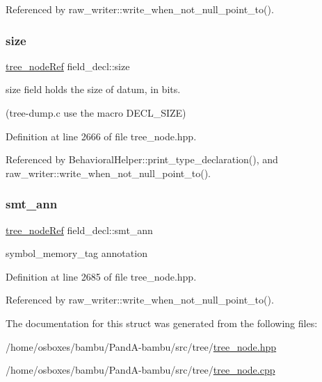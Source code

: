 Referenced by raw\+\_\+writer\+::write\+\_\+when\+\_\+not\+\_\+null\+\_\+point\+\_\+to().

\mbox{\label{structfield__decl_ab074346467af8cad446fb25cf82a73fe}} 
\subsubsection{\texorpdfstring{size}{size}}
{\footnotesize\ttfamily \hyperlink{tree__node_8hpp_a6ee377554d1c4871ad66a337eaa67fd5}{tree\+\_\+node\+Ref} field\+\_\+decl\+::size}



size field holds the size of datum, in bits. 

(tree-\/dump.\+c use the macro D\+E\+C\+L\+\_\+\+S\+I\+ZE) 

Definition at line 2666 of file tree\+\_\+node.\+hpp.



Referenced by Behavioral\+Helper\+::print\+\_\+type\+\_\+declaration(), and raw\+\_\+writer\+::write\+\_\+when\+\_\+not\+\_\+null\+\_\+point\+\_\+to().

\mbox{\label{structfield__decl_a66e3e30283c64fd9ac763d48c492a639}} 
\subsubsection{\texorpdfstring{smt\+\_\+ann}{smt\_ann}}
{\footnotesize\ttfamily \hyperlink{tree__node_8hpp_a6ee377554d1c4871ad66a337eaa67fd5}{tree\+\_\+node\+Ref} field\+\_\+decl\+::smt\+\_\+ann}



symbol\+\_\+memory\+\_\+tag annotation 



Definition at line 2685 of file tree\+\_\+node.\+hpp.



Referenced by raw\+\_\+writer\+::write\+\_\+when\+\_\+not\+\_\+null\+\_\+point\+\_\+to().



The documentation for this struct was generated from the following files\+:\begin{DoxyCompactItemize}
\item 
/home/osboxes/bambu/\+Pand\+A-\/bambu/src/tree/\hyperlink{tree__node_8hpp}{tree\+\_\+node.\+hpp}\item 
/home/osboxes/bambu/\+Pand\+A-\/bambu/src/tree/\hyperlink{tree__node_8cpp}{tree\+\_\+node.\+cpp}\end{DoxyCompactItemize}
